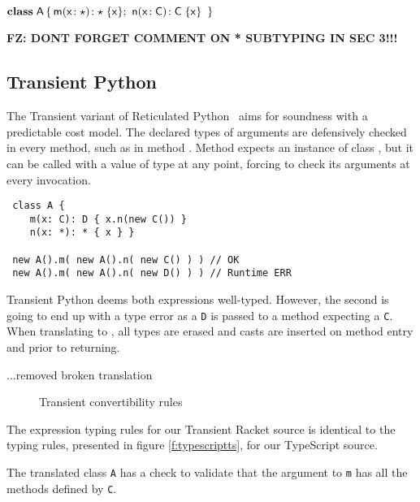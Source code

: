 \documentclass[acmlarge, anonymous, authordraft]{acmart}
\newcommand{\code}[1]{{\tt #1}\xspace}
\newcommand{\FZ}[1]{\textbf{FZ: #1}}
\begin{document}
\medskip
\(
 \Class \A {
    \Mdef \m\x\any \any  \x  ; \ 
    \Mdef \n\x\C\C  \x 
    }
\)

\medskip


\FZ{DONT FORGET COMMENT ON * SUBTYPING IN SEC 3!!!}

\subsection{Transient Python}

The Transient variant of Reticulated Python~\cite{siek14} aims for soundness
with a predictable cost model. The declared types of arguments are defensively
checked in every method, such as in method \m. Method \m expects an instance of
class \C, but it can be called with a value of type \any at any point, forcing
\m to check its arguments at every invocation.

\begin{lstlisting}
 class A {
    m(x: C): D { x.n(new C()) }
    n(x: *): * { x } }

 new A().m( new A().n( new C() ) ) // OK
 new A().m( new A().n( new D() ) ) // Runtime ERR
\end{lstlisting}

\noindent Transient Python deems both expressions well-typed. However, the
second is going to end up with a type error as a \code D is passed to a method
expecting a \code C.  When translating to \kafka, all types are erased and casts
are inserted on method entry and prior to returning.

...removed broken translation 

\begin{figure}
\hrulefill
\begin{mathpar}




\end{mathpar}
\hrulefill
\caption{Transient convertibility rules}\label{f:transientts}
\end{figure}

The expression typing rules for our Transient Racket source is identical to the 
typing rules, presented in figure \ref{f:typescriptts}, for our TypeScript source.

\noindent The translated class \code A has a check to validate that the
argument to \code m has all the methods defined by \code C.
\end{document}
